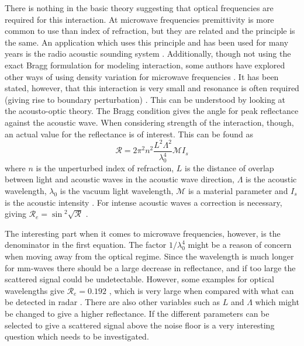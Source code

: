\documentclass[10pt,a4paper,twocolumn,draft]{scrartcl}
\begin{document}
	There is nothing in the basic theory suggesting that optical frequencies are required for this interaction. At microwave frequencies premittivity is more common to use than index of refraction, but they are related and the principle is the same. An application which uses this principle and has been used for many years is the radio acoustic sounding system \cite{Buerkle2007}. Additionally, though not using the exact Bragg formulation for modeling interaction, some authors have explored other ways of using density variation for microwave frequencies \cite{Lawrence2001}\cite{Merkel2006}. It has been stated, however, that this interaction is very small and resonance is often required (giving rise to boundary perturbation) \cite{Buerkle2007}. This can be understood by looking at the acousto-optic theory. The Bragg condition gives the angle for peak reflectance against the acoustic wave. When considering strength of the interaction, though, an actual value for the reflectance is of interest. This can be found as
	\begin{equation*}
		\mathcal{R} = 2\pi^2n^2 \frac{L^2 \Lambda^2}{\lambda_0^4} \mathcal{M}I_s
	\end{equation*}
	where $n$ is the unperturbed index of refraction, $L$ is the distance of overlap between light and acoustic waves in the acoustic wave direction, $\Lambda$ is the acoustic wavelength, $\lambda_0$ is the vacuum light wavelength, $\mathcal{M}$ is a material parameter and $I_s$ is the acoustic intensity \cite{Saleh2007}. For intense acoustic waves a correction is necessary, giving $\mathcal{R}_e = \sin{^2\sqrt{\mathcal{R}}}$ \cite{Saleh2007}.
	
	The interesting part when it comes to microwave frequencies, however, is the denominator in the first equation. The factor $1/\lambda_0^4$ might be a reason of concern when moving away from the optical regime. Since the wavelength is much longer for mm-waves there should be a large decrease in reflectance, and if too large the scattered signal could be undetectable. However, some examples for optical wavelengths give $\mathcal{R}_e = 0.192$ \cite{Saleh2007}, which is very large when compared with what can be detected in radar . There are also other variables such as $L$ and $\Lambda$ which might be changed to give a higher reflectance. If the different parameters can be selected to give a scattered signal above the noise floor is a very interesting question which needs to be investigated.
	
\end{document}

